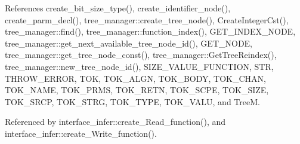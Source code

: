 References create\+\_\+bit\+\_\+size\+\_\+type(), create\+\_\+identifier\+\_\+node(), create\+\_\+parm\+\_\+decl(), tree\+\_\+manager\+::create\+\_\+tree\+\_\+node(), Create\+Integer\+Cst(), tree\+\_\+manager\+::find(), tree\+\_\+manager\+::function\+\_\+index(), G\+E\+T\+\_\+\+I\+N\+D\+E\+X\+\_\+\+N\+O\+DE, tree\+\_\+manager\+::get\+\_\+next\+\_\+available\+\_\+tree\+\_\+node\+\_\+id(), G\+E\+T\+\_\+\+N\+O\+DE, tree\+\_\+manager\+::get\+\_\+tree\+\_\+node\+\_\+const(), tree\+\_\+manager\+::\+Get\+Tree\+Reindex(), tree\+\_\+manager\+::new\+\_\+tree\+\_\+node\+\_\+id(), S\+I\+Z\+E\+\_\+\+V\+A\+L\+U\+E\+\_\+\+F\+U\+N\+C\+T\+I\+ON, S\+TR, T\+H\+R\+O\+W\+\_\+\+E\+R\+R\+OR, T\+OK, T\+O\+K\+\_\+\+A\+L\+GN, T\+O\+K\+\_\+\+B\+O\+DY, T\+O\+K\+\_\+\+C\+H\+AN, T\+O\+K\+\_\+\+N\+A\+ME, T\+O\+K\+\_\+\+P\+R\+MS, T\+O\+K\+\_\+\+R\+E\+TN, T\+O\+K\+\_\+\+S\+C\+PE, T\+O\+K\+\_\+\+S\+I\+ZE, T\+O\+K\+\_\+\+S\+R\+CP, T\+O\+K\+\_\+\+S\+T\+RG, T\+O\+K\+\_\+\+T\+Y\+PE, T\+O\+K\+\_\+\+V\+A\+LU, and TreeM.



Referenced by interface\+\_\+infer\+::create\+\_\+\+Read\+\_\+function(), and interface\+\_\+infer\+::create\+\_\+\+Write\+\_\+function().

